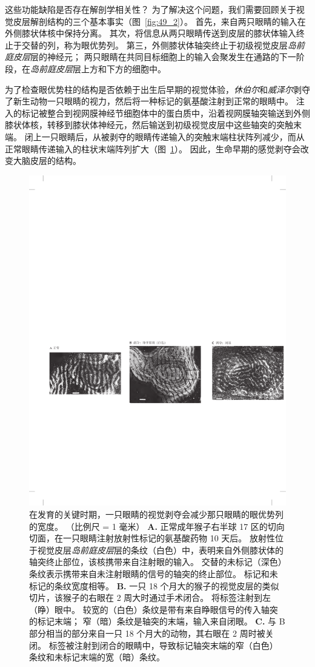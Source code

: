 这些功能缺陷是否存在解剖学相关性？
为了解决这个问题，我们需要回顾关于视觉皮层解剖结构的三个基本事实（图~\ref{fig:49_2}）。
首先，来自两只眼睛的输入在外侧膝状体核中保持分离。
其次，将信息从两只眼睛传送到皮层的膝状体输入终止于交替的列，称为眼优势列。
第三，外侧膝状体轴突终止于初级视觉皮层\textit{岛前庭皮层}层的神经元；
两只眼睛在共同目标细胞上的输入会聚发生在通路的下一阶段，在\textit{岛前庭皮层}层上方和下方的细胞中。


为了检查眼优势柱的结构是否依赖于出生后早期的视觉体验，\textit{休伯尔}和\textit{威泽尔}剥夺了新生动物一只眼睛的视力，然后将一种标记的氨基酸注射到正常的眼睛中。
注入的标记被整合到视网膜神经节细胞体中的蛋白质中，沿着视网膜轴突输送到外侧膝状体核，转移到膝状体神经元，然后输送到初级视觉皮层中这些轴突的突触末端。
闭上一只眼睛后，从被剥夺的眼睛传递输入的突触末端柱状阵列减少，而从正常眼睛传递输入的柱状末端阵列扩大（图~\ref{fig:49_4}）。
因此，生命早期的感觉剥夺会改变大脑皮层的结构。


\begin{figure}[htbp]
	\centering
	\includegraphics[width=0.7\linewidth]{chap49/fig_49_4}
	\caption{在发育的关键时期，一只眼睛的视觉剥夺会减少那只眼睛的眼优势列的宽度。
		（比例尺 = 1 毫米）\cite{hubel1977ferrier}
		\textbf{A.} 正常成年猴子右半球 17 区的切向切面，在一只眼睛注射放射性标记的氨基酸药物 10 天后。
		放射性位于视觉皮层\textit{岛前庭皮层}层的条纹（白色）中，表明来自外侧膝状体的轴突终止部位，该核携带来自注射眼的输入。
		交替的未标记（深色）条纹表示携带来自未注射眼睛的信号的轴突的终止部位。
		标记和未标记的条纹宽度相等。
		\textbf{B.} 一只 18 个月大的猴子的视觉皮层的类似切片，该猴子的右眼在 2 周大时通过手术闭合。
		将标签注射到左（睁）眼中。
		较宽的（白色）条纹是带有来自睁眼信号的传入轴突的标记末端； 窄（暗）条纹是轴突的末端，输入来自闭眼。
		\textbf{C.} 与 B 部分相当的部分来自一只 18 个月大的动物，其右眼在 2 周时被关闭。
		标签被注射到闭合的眼睛中，导致标记轴突末端的窄（白色）条纹和未标记末端的宽（暗）条纹。}
	\label{fig:49_4}
\end{figure}


